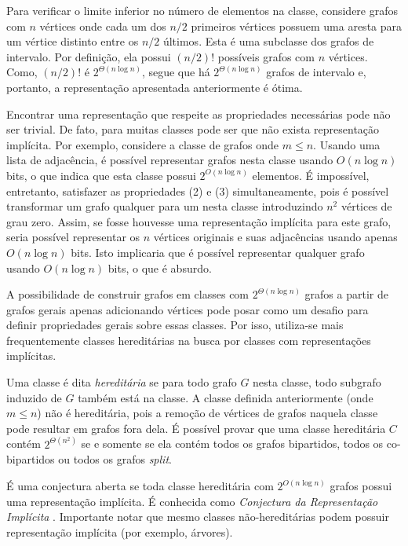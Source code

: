 Para verificar o limite inferior no número de elementos na classe, considere grafos com $n$ vértices onde cada um dos $n/2$ primeiros vértices possuem uma aresta para um vértice distinto entre os $n/2$ últimos. Esta é uma subclasse dos grafos de intervalo. Por definição, ela possui $(n/2)!$ possíveis grafos com $n$ vértices. Como, $(n/2)!$ é $2^{\Theta(n \log n)}$, segue que há $2^{\Theta(n \log n)}$ grafos de intervalo e, portanto, a representação apresentada anteriormente é ótima.

Encontrar uma representação que respeite as propriedades necessárias pode não ser trivial. De fato, para muitas classes pode ser que não exista representação implícita. Por exemplo, considere a classe de grafos onde $m \leq n$. Usando uma lista de adjacência, é possível representar grafos nesta classe usando $O(n \log n)$ bits, o que indica que esta classe possui $2^{O(n\log n)}$ elementos. É impossível, entretanto, satisfazer as propriedades (2) e (3) simultaneamente, pois é possível transformar um grafo qualquer para um nesta classe introduzindo $n^2$ vértices de grau zero. Assim, se fosse houvesse uma representação implícita para este grafo, seria possível representar os $n$ vértices originais e suas adjacências usando apenas $O(n \log n)$ bits. Isto implicaria que é possível representar qualquer grafo usando $O(n \log n)$ bits, o que é absurdo.

A possibilidade de construir grafos em classes com $2^{\Theta(n\log n)}$ grafos a partir de grafos gerais apenas adicionando vértices pode posar como um desafio para definir propriedades gerais sobre essas classes. Por isso, utiliza-se mais frequentemente classes hereditárias na busca por classes com representações implícitas.

Uma classe é dita \emph{hereditária} se para todo grafo $G$ nesta classe, todo subgrafo induzido de $G$ também está na classe. A classe definida anteriormente (onde $m \leq n$) não é hereditária, pois a remoção de vértices de grafos naquela classe pode resultar em grafos fora dela. É possível provar que uma classe hereditária $C$ contém $2^{\Theta(n^2)}$ se e somente se ela contém todos os grafos bipartidos, todos os co-bipartidos ou todos os grafos \emph{split}.

É uma conjectura aberta se toda classe hereditária com $2^{O(n \log n)}$ grafos possui uma representação implícita. É conhecida como \emph{Conjectura da Representação Implícita} \cite{kannan1992implicat,spinrad2003efficient,chandoo2016implicit}. Importante notar que mesmo classes não-hereditárias podem possuir representação implícita (por exemplo, árvores).

